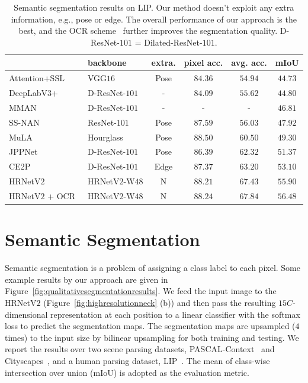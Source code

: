 \documentclass[10pt,journal,compsoc]{IEEEtran}
\begin{document}
\renewcommand{\arraystretch}{1.3}
	\setlength{\tabcolsep}{2.8pt}
	\begin{table}[t]
	\scriptsize
	\centering
	\caption{Semantic segmentation results on LIP. Our method doesn't exploit 
	any extra information, e.g., pose or edge. 
	{
	The overall performance of our approach is the best, and the OCR scheme~\cite{YuanCW18}
	further improves the segmentation quality.}
	D-ResNet-$101$ = Dilated-ResNet-$101$.}
	\label{tab:lipresults}
	\vspace{-.3cm}
	\begin{tabular}{l|lc|ccc}
		\hline
		 & backbone & extra. & pixel acc. & avg. acc. & mIoU \\
		\hline
		
		\hline
		Attention+SSL~\cite{GongLSL17} & VGG$16$ & Pose & $84.36$ & $54.94$ & $44.73$ \\
		DeepLabV$3$+~\cite{ChenZPSA18} & D-ResNet-$101$ & - & $84.09$ & $55.62$ & $44.80$ \\
		MMAN~\cite{LuoZZGYY18} & D-ResNet-$101$ & - & - & - & $46.81$ \\
		SS-NAN~\cite{ZhaoLNZCWFY17} & ResNet-$101$ & Pose & $87.59$ & $56.03$ & $47.92$ \\
		MuLA~\cite{NieFY18} & Hourglass & Pose & $\mathbf{88.50}$ & $60.50$ & $49.30$ \\
		JPPNet~\cite{XL18} & D-ResNet-$101$ & Pose & $86.39$ & $62.32$ & $51.37$ \\
		CE2P~\cite{TL18}  & D-ResNet-$101$ & Edge & $87.37$ & $63.20$ & $53.10$ \\
		\hline
		HRNetV$2$ & HRNetV$2$-W$48$ & N & $88.21$ & $67.43$ & $55.90$ \\	
		HRNetV$2$ + OCR~\cite{YuanCW18} & HRNetV$2$-W$48$ & N & $88.24$ & $\mathbf{67.84}$ & $\mathbf{56.48}$\\
		\hline
	\end{tabular}
	 \vspace{-2mm}
	\end{table}
	
	
	
	
	
\section{Semantic Segmentation}
Semantic segmentation
is a problem of assigning
a class label to each pixel.
Some example results 
by our approach
are given in Figure~\ref{fig:qualitativesegmentationresults}.
We feed the input image 
to the HRNetV$2$ (Figure~\ref{fig:highresolutionneck} (b))
and then pass the resulting $15C$-dimensional representation
at each position 
to a linear classifier 
with the softmax loss
to predict the segmentation maps.
The segmentation maps are upsampled ($4$ times) 
to the input size by bilinear upsampling
for both training and testing.
We report the results over 
two scene parsing datasets, PASCAL-Context~\cite{MottaghiCLCLFUY14} and
Cityscapes~\cite{CordtsORREBFRS16},
and a human parsing dataset, LIP~\cite{GongLSL17}. The mean of class-wise intersection over union (mIoU) 
is adopted as the evaluation metric.
\end{document}
